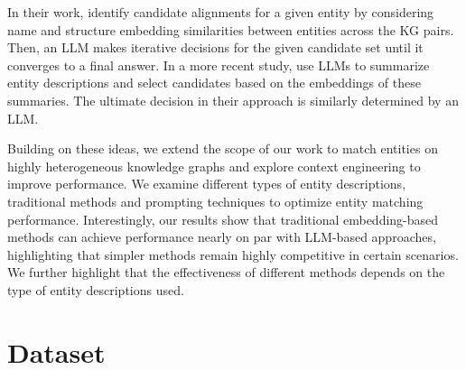 \documentclass[11pt]{article}
\begin{document}
In their work, \citet{compare_1} identify candidate alignments for a given entity by considering name and structure embedding similarities between entities across the KG pairs. Then, an LLM makes iterative decisions for the given candidate set until it converges to a final answer. In a more recent study, \citet{compare_2} use LLMs to summarize entity descriptions and select candidates based on the embeddings of these summaries. The ultimate decision in their approach is similarly determined by an LLM.

Building on these ideas, we extend the scope of our work to match entities on highly heterogeneous knowledge graphs and explore context engineering to improve performance. We examine different types of entity descriptions, traditional methods and prompting techniques to optimize entity matching performance. Interestingly, our results show that traditional embedding-based methods can achieve performance nearly on par with LLM-based approaches, highlighting that simpler methods remain highly competitive in certain scenarios. We further highlight that the effectiveness of different methods depends on the type of entity descriptions used.

\section{Dataset}
\label{sec:dataset}

\begin{table*}[h]
\centering
{}
\vspace{-6px}
\caption{The scraped fandom sites and their graph's sizes}
\label{tab:datasets}
\end{table*}
\end{document}
